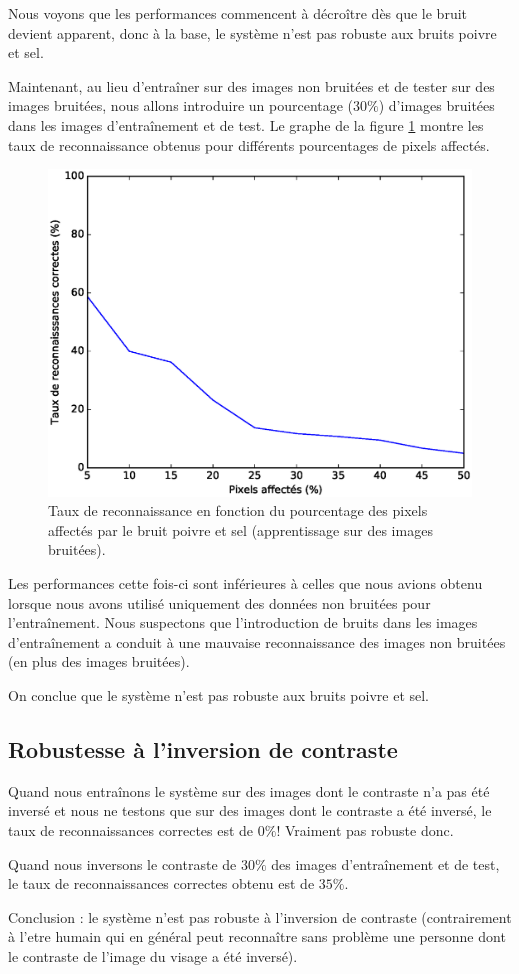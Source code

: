 Nous voyons que les performances commencent à décroître dès que le bruit
devient apparent, donc à la base, le système n'est pas robuste aux bruits
poivre et sel.

Maintenant, au lieu d'entraîner sur des images non bruitées et de tester sur des 
images bruitées, nous allons introduire un pourcentage ($30\%$) d'images bruitées
dans les images d'entraînement et de test. Le graphe de la figure \ref{fig:robustness:sp:tout} 
montre les taux de reconnaissance obtenus pour différents pourcentages de pixels affectés.
\begin{figure}[H]
    \centering
    \includegraphics[scale=0.5]{images/robustesse_sp_tout}
    \caption{Taux de reconnaissance en fonction du pourcentage des pixels affectés par le bruit
    poivre et sel (apprentissage sur des images bruitées).}
    \label{fig:robustness:sp:tout}
\end{figure}
Les performances cette fois-ci sont inférieures à celles que nous avions obtenu lorsque nous
avons utilisé uniquement des données non bruitées pour l'entraînement. Nous suspectons que 
l'introduction de bruits dans les images d'entraînement a conduit à une mauvaise reconnaissance
des images non bruitées (en plus des images bruitées).

On conclue que le système n'est pas robuste aux bruits poivre et sel.


\subsection{Robustesse à l'inversion de contraste}
Quand nous entraînons le système sur des images dont le contraste n'a pas été inversé et nous
ne testons que sur des images dont le contraste a été inversé, le taux de reconnaissances
correctes est de $0\%$! Vraiment pas robuste donc.

Quand nous inversons le contraste de $30\%$ des images d'entraînement et de test, le taux de
reconnaissances correctes obtenu est de $35\%$.

Conclusion : le système n'est pas robuste à l'inversion de contraste (contrairement à l'etre
humain qui en général peut reconnaître sans problème une personne dont le contraste de l'image
du visage a été inversé).